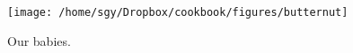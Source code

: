 \begin{figure}[t]
\begin{center}
\texttt{[image: /home/sgy/Dropbox/cookbook/figures/butternut]}
\end{center}
\caption*{Our babies.}
\end{figure}



